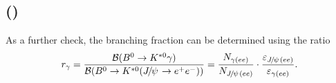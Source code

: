 




%
%
%
%

\subsection{\BR(\BdToKstG)}

As a further check, the \BdToKstG branching fraction can be determined using the ratio
%
$$r_\gamma = \frac{\BR(\BdToKstG)} {\BR(\BdToKstJPsee)} = \frac{N_{\gamma(ee)}}{N_{\jpsi(ee)}} \cdot \frac{\varepsilon_{\jpsi(ee)}}{\varepsilon_{\gamma(ee)}}.$$

